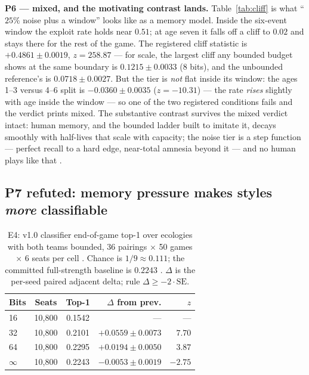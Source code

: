 \documentclass[11pt]{article}
\begin{document}
\textbf{P6 --- mixed, and the motivating contrast lands.} Table~\ref{tab:cliff} is what
``$25\%$ noise plus a window'' looks like as a memory model. Inside the six-event
window the exploit rate holds near $0.51$; at age seven it falls off a cliff to
$0.02$ and stays there for the rest of the game. The registered cliff statistic is
$+0.4861 \pm 0.0019$, $z = 258.87$ --- for scale, the largest cliff any bounded budget
shows at the same boundary is $0.1215 \pm 0.0033$ (8 bits), and the unbounded
reference's is $0.0718 \pm 0.0027$. But the tier is \emph{not} flat inside its window:
the ages 1--3 versus 4--6 split is $-0.0360 \pm 0.0035$ ($z = -10.31$) --- the rate
\emph{rises} slightly with age inside the window --- so one of the two registered
conditions fails and the verdict prints mixed. The substantive contrast survives the
mixed verdict intact: human memory, and the bounded ladder built to imitate it, decays
smoothly with half-lives that scale with capacity; the noise tier is a step function
--- perfect recall to a hard edge, near-total amnesia beyond it --- and no human plays
like that \cite{playstyles,andersonschooler1991}.

\subsection{P7 refuted: memory pressure makes styles \emph{more} classifiable}
\label{sec:p7}

\begin{table}[t]
\centering
\caption{E4: v1.0 classifier end-of-game top-1 over ecologies with both teams bounded,
36 pairings $\times$ 50 games $\times$ 6 seats per cell \cite{artifact}. Chance is
$1/9 \approx 0.111$; the committed full-strength baseline is $0.2243$
\cite{adaptiveartifact}. $\Delta$ is the per-seed paired adjacent delta; rule
$\Delta \ge -2 \cdot \text{SE}$.}
\label{tab:e4}
\footnotesize
\begin{tabular}{@{}lccrr@{}}
\toprule
Bits & Seats & Top-1 & $\Delta$ from prev. & $z$ \\
\midrule
16       & 10{,}800 & 0.1542 & ---                  & --- \\
32       & 10{,}800 & 0.2101 & $+0.0559 \pm 0.0073$ & $7.70$ \\
64       & 10{,}800 & 0.2295 & $+0.0194 \pm 0.0050$ & $3.87$ \\
$\infty$ & 10{,}800 & 0.2243 & $-0.0053 \pm 0.0019$ & $\mathbf{-2.75}$ \\
\bottomrule
\end{tabular}
\end{table}
\end{document}
